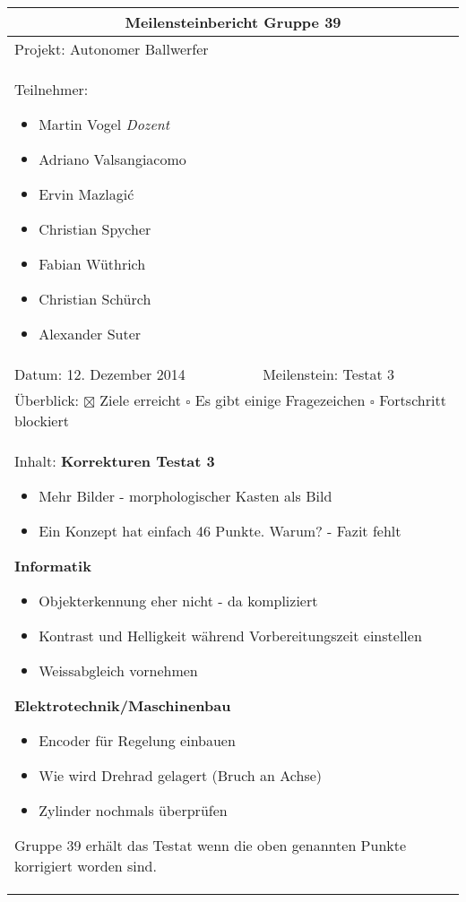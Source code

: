 \begin{table}[!h]
	\renewcommand{\arraystretch}{1.5}
	\begin{tabularx}{\linewidth}{|X|X|}
		\hline
		\multicolumn{2}{|c|}{
			\parbox[0pt][3em][c]{0cm}{}
			{\large \textbf{Meilensteinbericht Gruppe 39}}
		} \\
		\hline
		\multicolumn{2}{|l|}{Projekt: Autonomer Ballwerfer} \\
		\hline
		\multicolumn{2}{|p{0.95\textwidth}|}{
			Teilnehmer:
			\begin{itemize}
				\setlength\itemsep{0em}
				\item Martin Vogel \textit{Dozent}
				\item Adriano Valsangiacomo
				\item Ervin Mazlagi\'c
				\item Christian Spycher
				\item Fabian Wüthrich
				\item Christian Schürch
				\item Alexander Suter
			\end{itemize}
		} \\
		\hline
		Datum: 12. Dezember 2014 & Meilenstein: Testat 3 \\
		\hline
		\multicolumn{2}{|p{0.95\textwidth}|}{
			Überblick: \newline
			$\boxtimes$ Ziele erreicht \newline 
			$\square$ Es gibt einige Fragezeichen \newline
			$\square$ Fortschritt blockiert
		} \\
		\hline
		\multicolumn{2}{|p{0.95\textwidth}|}{
			Inhalt: \newline
			\textbf{Korrekturen Testat 3}
			\begin{itemize}
				\item Mehr Bilder - morphologischer Kasten als Bild
				\item Ein Konzept hat einfach 46 Punkte. Warum? - Fazit fehlt
			\end{itemize}
			\textbf{Informatik}
			\begin{itemize}
				\item Objekterkennung eher nicht - da kompliziert
				\item Kontrast und Helligkeit während Vorbereitungszeit einstellen
				\item Weissabgleich vornehmen
			\end{itemize}
			\textbf{Elektrotechnik/Maschinenbau}
			\begin{itemize}
				\item Encoder für Regelung einbauen
				\item Wie wird Drehrad gelagert (Bruch an Achse)
				\item Zylinder nochmals überprüfen
			\end{itemize}
			Gruppe 39 erhält das Testat wenn die oben genannten Punkte korrigiert worden sind.
		} \\
		\hline
	\end{tabularx}
\end{table}